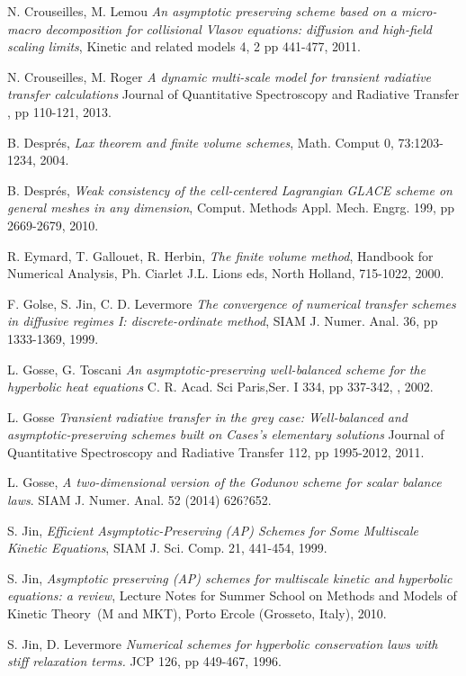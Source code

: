 \documentclass[a4paper,french,english,10pt]{article}
\begin{document}
{\begin{thebibliography}{abcde}
 N. Crouseilles, M. Lemou \emph{An asymptotic preserving
scheme based on a micro-macro decomposition for collisional Vlasov equations:
diffusion and high-field scaling limits}, Kinetic and related models 4, 2 
pp 441-477, 2011.

 N. Crouseilles, M. Roger \emph{A dynamic multi-scale
model for transient radiative transfer calculations} Journal of Quantitative
Spectroscopy and Radiative Transfer , pp 110-121, 2013.

 B. Despr\'es,  \emph{Lax theorem and finite volume
schemes},
Math. Comput 0, 73:1203-1234, 2004.

 B. Despr\'es,  \emph{Weak consistency of the cell-centered
Lagrangian GLACE scheme on general
meshes in any dimension}, Comput. Methods Appl. Mech. Engrg. 199, pp 
2669-2679, 2010.

 R. Eymard, T. Gallouet, R. Herbin, \emph{The finite volume
method}, Handbook for Numerical Analysis, Ph. Ciarlet J.L. Lions eds, North
Holland, 715-1022, 2000.


 F. Golse, S. Jin, C. D. Levermore \emph{The convergence
of numerical transfer schemes in diffusive regimes I: discrete-ordinate method},
SIAM J. Numer. Anal. 36, pp 1333-1369, 1999.

 L. Gosse, G. Toscani \emph{An asymptotic-preserving
well-balanced scheme for the hyperbolic heat equations} C. R. Acad. Sci
Paris,Ser. I 334, pp  337-342, , 2002.

 L. Gosse \emph{Transient radiative transfer in the grey
case: Well-balanced and asymptotic-preserving schemes built on Cases's
elementary solutions} Journal of Quantitative Spectroscopy and Radiative
Transfer 112, pp 1995-2012, 2011.

  L. Gosse, \emph{A two-dimensional version of the Godunov scheme for scalar balance laws}. SIAM J. Numer. Anal. 52 (2014) 626?652.

 S. Jin, \emph{Efficient Asymptotic-Preserving (AP)
Schemes for Some Multiscale Kinetic Equations},  SIAM J. Sci. Comp. 21, 441-454,
1999.

 S. Jin, \emph{Asymptotic preserving (AP) schemes for
multiscale kinetic and hyperbolic equations: a review}, Lecture Notes for Summer
School on \og Methods and Models of Kinetic Theory\fg\, (M and MKT), Porto
Ercole (Grosseto, Italy),  2010.

 S. Jin, D. Levermore \emph{Numerical schemes for
hyperbolic conservation laws with stiff relaxation terms.} JCP 126, pp 449-467,
1996.


\end{thebibliography}}
\end{document}
